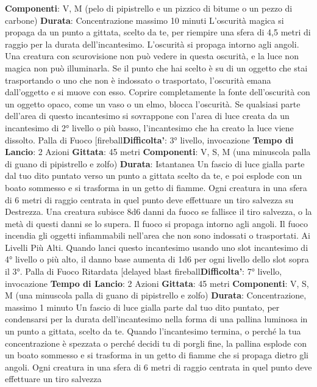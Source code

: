 \begin{multicols}{2}
\textbf{Componenti}: V, M (pelo di pipistrello e un pizzico di
bitume o un pezzo di carbone)
\textbf{Durata}: Concentrazione massimo 10 minuti
L’oscurità magica si propaga da un punto a gittata,
scelto da te, per riempire una sfera di 4,5 metri di raggio
per la durata dell’incantesimo. L’oscurità si propaga
intorno agli angoli. Una creatura con scurovisione non
può vedere in questa oscurità, e la luce non magica non
può illuminarla.
Se il punto che hai scelto è su di un oggetto che stai
trasportando o uno che non è indossato o trasportato,
l’oscurità emana dall’oggetto e si muove con esso.
Coprire completamente la fonte dell’oscurità con un
oggetto opaco, come un vaso o un elmo, blocca
l’oscurità.
Se qualsiasi parte dell’area di questo incantesimo si
sovrappone con l’area di luce creata da un incantesimo
di 2° livello o più basso, l’incantesimo che ha creato la
luce viene dissolto.
Palla di Fuoco
[fireball\textbf{Difficolta'}:
3° livello, invocazione
\textbf{Tempo di Lancio}: 2 Azioni
\textbf{Gittata}: 45 metri
\textbf{Componenti}: V, S, M (una minuscola palla di guano di
pipistrello e zolfo)
\textbf{Durata}: Istantanea
Un fascio di luce gialla parte dal tuo dito puntato verso
un punto a gittata scelto da te, e poi esplode con un
boato sommesso e si trasforma in un getto di fiamme.
Ogni creatura in una sfera di 6 metri di raggio centrata
in quel punto deve effettuare un tiro salvezza su
Destrezza. Una creatura subisce 8d6 danni da fuoco se
fallisce il tiro salvezza, o la metà di questi danni se lo
supera.
Il fuoco si propaga intorno agli angoli. Il fuoco incendia
gli oggetti infiammabili nell’area che non sono indossati
o trasportati.
Ai Livelli Più Alti. Quando lanci questo incantesimo
usando uno slot incantesimo di 4° livello o più alto, il
danno base aumenta di 1d6 per ogni livello dello slot
sopra il 3°.
Palla di Fuoco Ritardata
[delayed blast fireball\textbf{Difficolta'}:
7° livello, invocazione
\textbf{Tempo di Lancio}: 2 Azioni
\textbf{Gittata}: 45 metri
\textbf{Componenti}: V, S, M (una minuscola palla di guano di
pipistrello e zolfo)
\textbf{Durata}: Concentrazione, massimo 1 minuto
Un fascio di luce gialla parte dal tuo dito puntato, per
condensarsi per la durata dell’incantesimo nella forma
di una pallina luminosa in un punto a gittata, scelto da
te. Quando l’incantesimo termina, o perché la tua
concentrazione è spezzata o perché decidi tu di porgli
fine, la pallina esplode con un boato sommesso e si
trasforma in un getto di fiamme che si propaga dietro gli
angoli. Ogni creatura in una sfera di 6 metri di raggio
centrata in quel punto deve effettuare un tiro salvezza

\end{multicols}
